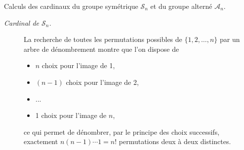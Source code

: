 \documentclass{article}
\renewenvironment{question_kholle}[2][ ]
{
	\subsection{\texorpdfstring{#2}{}}
	\notblank{#1}
	{
		\noindent #1
		\bigbreak
	}
	{}
	\begin{proof}
}
{
	\end{proof}
}
\begin{document}
\begin{question_kholle}{Calculs des cardinaux du groupe symétrique $\mathcal{S}_{n}$ et du groupe alterné $\mathcal{A}_{n}$.}
	\hfill
	\begin{description}
		\item[\textit{Cardinal de $\mathcal{S}_{n}$.}] La recherche de toutes les permutations possibles de $\{1,2,\dots,n\}$ par un arbre de dénombrement montre que l’on dispose de \begin{itemize}
			      \item $n$ choix pour l’image de 1,
			      \item $(n-1)$ choix pour l’image de 2,
			      \item ...
			      \item 1 choix pour l’image de $n$,
		      \end{itemize} ce qui permet de dénombrer, par le principe des choix successifs, exactement $n(n-1)\cdots 1= n!$ permutations deux à deux distinctes.


\end{description}
\end{question_kholle}
\end{document}
